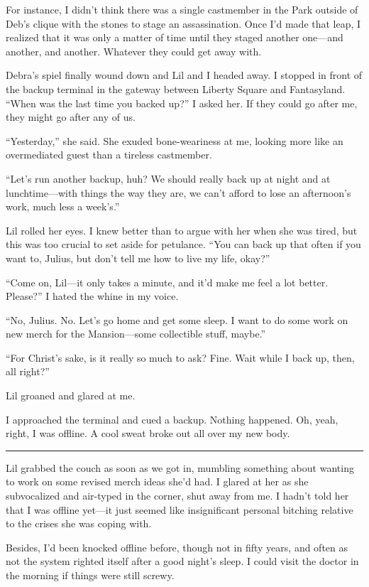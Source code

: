 For instance, I didn't think there was a single castmember in the
Park outside of Deb's clique with the stones to stage an
assassination. Once I'd made that leap, I realized that it was only
a matter of time until they staged another one—and another, and
another. Whatever they could get away with.

Debra's spiel finally wound down and Lil and I headed away. I
stopped in front of the backup terminal in the gateway between
Liberty Square and Fantasyland. “When was the last time you backed
up?” I asked her. If they could go after me, they might go after
any of us.

“Yesterday,” she said. She exuded bone-weariness at me, looking
more like an overmediated guest than a tireless castmember.

“Let's run another backup, huh? We should really back up at night
and at lunchtime—with things the way they are, we can't afford to
lose an afternoon's work, much less a week's.”

Lil rolled her eyes. I knew better than to argue with her when she
was tired, but this was too crucial to set aside for petulance.
“You can back up that often if you want to, Julius, but don't tell
me how to live my life, okay?”

“Come on, Lil—it only takes a minute, and it'd make me feel a lot
better. Please?” I hated the whine in my voice.

“No, Julius. No. Let's go home and get some sleep. I want to do
some work on new merch for the Mansion—some collectible stuff,
maybe.”

“For Christ's sake, is it really so much to ask? Fine. Wait while I
back up, then, all right?”

Lil groaned and glared at me.

I approached the terminal and cued a backup. Nothing happened. Oh,
yeah, right, I was offline. A cool sweat broke out all over my new
body.

\begin{center}\rule{3in}{0.4pt}\end{center}

Lil grabbed the couch as soon as we got in, mumbling something
about wanting to work on some revised merch ideas she'd had. I
glared at her as she subvocalized and air-typed in the corner, shut
away from me. I hadn't told her that I was offline yet—it just
seemed like insignificant personal bitching relative to the crises
she was coping with.

Besides, I'd been knocked offline before, though not in fifty
years, and often as not the system righted itself after a good
night's sleep. I could visit the doctor in the morning if things
were still screwy.

